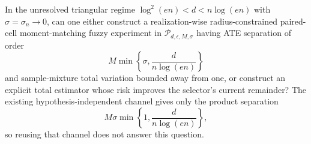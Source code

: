 In the unresolved triangular regime \(\log^2(en)<d<n\log(en)\) with \(\sigma=\sigma_n\to0\), can one either construct a realization-wise radius-constrained paired-cell moment-matching fuzzy experiment in \(\mathcal P_{d,\epsilon,M,\sigma}\) having ATE separation of order
\[
 M\min\left\{\sigma,\frac{d}{n\log(en)}\right\}
\]
and sample-mixture total variation bounded away from one, or construct an explicit total estimator whose risk improves the selector's current remainder?  The existing hypothesis-independent channel gives only the product separation
\[
 M\sigma\min\left\{1,\frac{d}{n\log(en)}\right\},
\]
so reusing that channel does not answer this question.